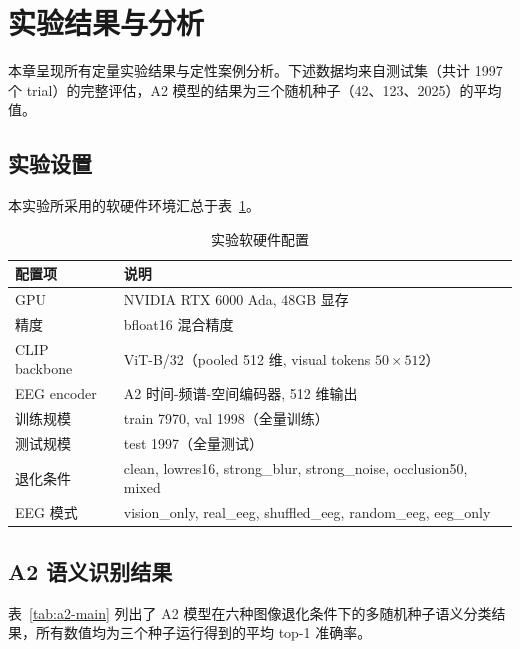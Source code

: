 \section{实验结果与分析}

本章呈现所有定量实验结果与定性案例分析。下述数据均来自测试集（共计 1997 个 trial）的完整评估，A2 模型的结果为三个随机种子（42、123、2025）的平均值。

\subsection{实验设置}

本实验所采用的软硬件环境汇总于表~\ref{tab:exp-setup}。

\begin{table}[htbp]
  \centering
  \caption{实验软硬件配置}
  \label{tab:exp-setup}
  \begin{tabular}{l l}
    \toprule
    配置项 & 说明 \\
    \midrule
    GPU & NVIDIA RTX 6000 Ada, 48GB 显存 \\
    精度 & bfloat16 混合精度 \\
    CLIP backbone & ViT-B/32（pooled 512 维, visual tokens $50\times512$）\\
    EEG encoder & A2 时间-频谱-空间编码器, 512 维输出 \\
    训练规模 & train 7970, val 1998（全量训练）\\
    测试规模 & test 1997（全量测试）\\
    退化条件 & clean, lowres16, strong\_blur, strong\_noise, occlusion50, mixed \\
    EEG 模式 & vision\_only, real\_eeg, shuffled\_eeg, random\_eeg, eeg\_only \\
    \bottomrule
  \end{tabular}
\end{table}

\subsection{A2 语义识别结果}

表~\ref{tab:a2-main} 列出了 A2 模型在六种图像退化条件下的多随机种子语义分类结果，所有数值均为三个种子运行得到的平均 top-1 准确率。

